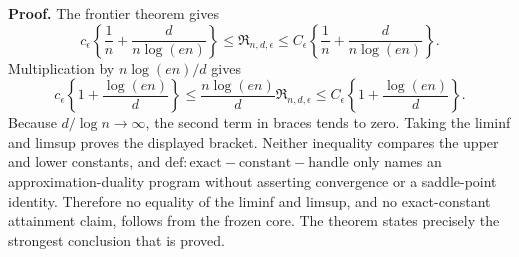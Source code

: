 \textbf{Proof.}
The frontier theorem gives
\[
 c_\epsilon\left\{\frac1n+\frac d{n\log(en)}\right\}
 \le\mathfrak R_{n,d,\epsilon}
 \le C_\epsilon\left\{\frac1n+\frac d{n\log(en)}\right\}.
\]
Multiplication by \(n\log(en)/d\) gives
\[
 c_\epsilon\left\{1+\frac{\log(en)}d\right\}
 \le\frac{n\log(en)}d\mathfrak R_{n,d,\epsilon}
 \le C_\epsilon\left\{1+\frac{\log(en)}d\right\}.
\]
Because \(d/\log n\to\infty\), the second term in braces tends to zero.  Taking the liminf and limsup proves the displayed bracket.  Neither inequality compares the upper and lower constants, and \(\mathrm{def:exact-constant-handle}\) only names an approximation-duality program without asserting convergence or a saddle-point identity.  Therefore no equality of the liminf and limsup, and no exact-constant attainment claim, follows from the frozen core.  The theorem states precisely the strongest conclusion that is proved.
